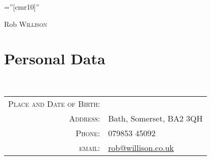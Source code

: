 \documentclass[a4paper,12pt]{article}
\begin{document}

\pagestyle{empty} %

\font\fb=''[cmr10]'' %

\par{\centering
		{Rob \textsc{Willison}
	}\bigskip\par}

\section{Personal Data}
\
\begin{tabular}{rl}
    \textsc{Place and Date of Birth:} & \\
    \textsc{Address:}   & Bath, Somerset, BA2 3QH\\
    \textsc{Phone:}     & 079853 45092\\
    \textsc{email:}     & \href{mailto:rob@willison.co.uk}{rob@willison.co.uk}
\end{tabular}

\end{document}
